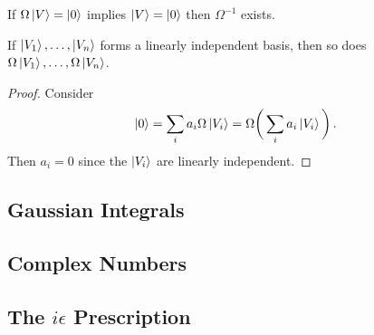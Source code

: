 \begin{theorem}
If $\Omega \ket{V} = \ket{0}$ implies $\ket{V} = \ket{0}$ then $\Omega^{-1}$ exists.
\end{theorem}

\begin{lemma}
If $\ket{V_1}, \dots, \ket{V_n}$ forms a linearly independent basis, then so does $\Omega\ket{V_1}, \dots, \Omega\ket{V_n}$.
\end{lemma}

\begin{proof}
Consider
\[ \ket{0} = \sum_i a_i\Omega\ket{V_i} = \Omega \bigg{(}\sum_i a_i\ket{V_i}\bigg{)}\,. \]
Then $a_i = 0$ since the $\ket{V_i}$ are linearly independent.
\end{proof}

\subsection{Gaussian Integrals}

\subsection{Complex Numbers}

\subsection[The Principle Value Integral]{The $i\epsilon$ Prescription}
